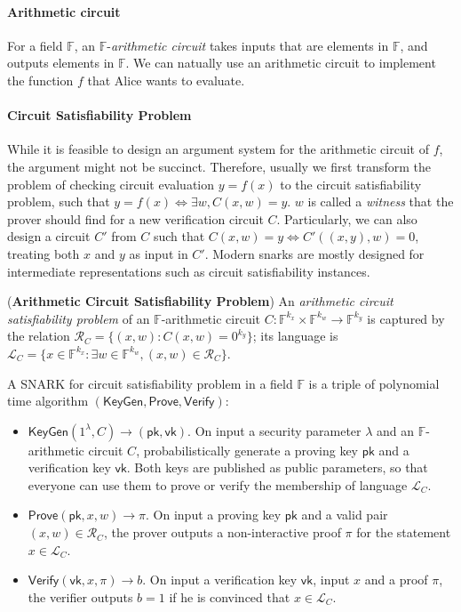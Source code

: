 \paragraph{Arithmetic circuit} For a field $\mathbb{F}$, an $\mathbb{F}$-\textit{arithmetic circuit} takes inputs that are elements in $\mathbb{F}$, and outputs elements in $\mathbb{F}$. We can natually use an arithmetic circuit to implement the function $f$ that Alice wants to evaluate. 

\paragraph{Circuit Satisfiability Problem} While it is feasible to design an argument system for the arithmetic circuit of $f$, the argument might not be succinct. Therefore, usually we first transform the problem of checking circuit evaluation $y=f(x)$ to the circuit satisfiability problem, such that $y=f(x)\iff \exists w, C(x, w)=y$. $w$ is called a \textit{witness} that the prover should find for a new verification circuit $C$. Particularly, we can also design a circuit $C'$ from $C$ such that $C(x,w)=y\iff C'((x,y), w)=0$, treating both $x$ and $y$ as input in $C'$.  Modern snarks are mostly designed for intermediate representations such as circuit satisfiability instances. 

\begin{definition}{(\textbf{Arithmetic Circuit Satisfiability Problem})}
    An \textit{arithmetic circuit satisfiability problem} of an $\mathbb{F}$-arithmetic circuit $C:\mathbb{F}^{k_x} \times \mathbb{F}^{k_w} \to \mathbb{F}^{k_y}$ is captured by the relation $\mathcal{R}_C = \{(x, w): C(x, w)=0^{k_y}\}$; its language is $\mathcal{L}_C=\{x\in \mathbb{F}^{k_x}: \exists w\in\mathbb{F}^{k_w}, (x, w)\in \mathcal{R}_C \}$.  
\end{definition}

A SNARK for circuit satisfiability problem in a field $\mathbb{F}$ is a triple of polynomial time algorithm $(\mathsf{KeyGen}, \mathsf{Prove}, \mathsf{Verify})$:
\begin{itemize}
    \item $\mathsf{KeyGen}(1^\lambda, C)\to (\mathsf{pk}, \mathsf{vk})$. On input a security parameter $\lambda$ and an $\mathbb{F}$-arithmetic circuit $C$, probabilistically generate a proving key $\mathsf{pk}$ and a verification key $\mathsf{vk}$. Both keys are published as public parameters, so that everyone can use them to prove or verify the membership of language $\mathcal{L}_C$. 
    \item $\mathsf{Prove}(\mathsf{pk}, x, w)\to \pi$. On input a proving key $\mathsf{pk}$ and a valid pair $(x, w)\in \mathcal{R}_C$, the prover outputs a non-interactive proof $\pi$ for the statement $x\in \mathcal{L}_C$. 
    \item $\mathsf{Verify}(\mathsf{vk}, x, \pi)\to b$. On input a verification key $\mathsf{vk}$, input $x$ and a proof $\pi$, the verifier outputs $b=1$ if he is convinced that $x\in \mathcal{L}_C$. 
\end{itemize}

